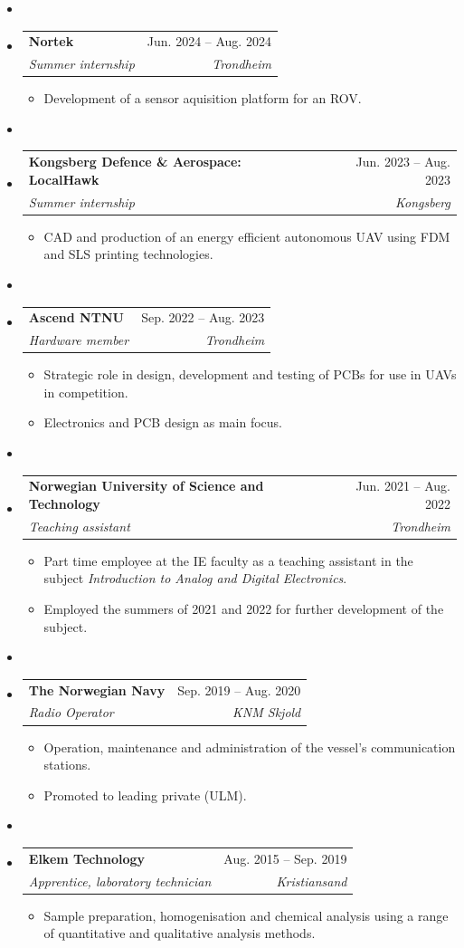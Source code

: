 \documentclass[letterpaper,12pt]{article}[leftmargin=*]
\makeatletter
\def \entryspacing {-0pt}
\newcommand{\resumeEntryStart}{\begin{itemize}[leftmargin=2.5mm]\item[]}
\newcommand{\resumeEntryEnd}{\end{itemize}\vspace{\entryspacing}}
\newcommand{\resumeItemListStart}{\begin{itemize}[leftmargin=4.5mm]}
\newcommand{\resumeItemListEnd}{\end{itemize}}
\newcommand{\resumeItem}[1]{
  \item\small{
    {#1 \vspace{-2pt}}
  }
}
\newcommand{\resumeEntryTSDL}[4]{
  \vspace{-1pt}\item[]
    \begin{tabularx}{0.97\textwidth}{X@{\hspace{60pt}}r}
      \textbf{\color{primary}#1} & {\firabook\color{accent}\small#2} \\
      \textit{\color{accent}\small#3} & \textit{\color{accent}\small#4} \\
    \end{tabularx}\vspace{-6pt}
}
\makeatother
\begin{document}
  \resumeEntryStart
    \resumeEntryTSDL
    {Nortek}{Jun. 2024 -- Aug. 2024}
    {Summer internship}{Trondheim}
  \resumeItemListStart
    \resumeItem{Development of a sensor aquisition platform for an ROV.}
  \resumeItemListEnd
  \resumeEntryEnd

  \resumeEntryStart
    \resumeEntryTSDL
      {Kongsberg Defence \& Aerospace: LocalHawk}{Jun. 2023 -- Aug. 2023}
      {Summer internship}{Kongsberg}
    \resumeItemListStart
      \resumeItem {CAD and production of an energy efficient autonomous UAV using FDM and SLS printing technologies.}
    \resumeItemListEnd
  \resumeEntryEnd

  \resumeEntryStart
    \resumeEntryTSDL
      {Ascend NTNU}{Sep. 2022 -- Aug. 2023}
      {Hardware member}{Trondheim}
    \resumeItemListStart
      \resumeItem {Strategic role in design, development and testing of PCBs for use in UAVs in competition.}
      \resumeItem {Electronics and PCB design as main focus.}
    \resumeItemListEnd
  \resumeEntryEnd

  \resumeEntryStart
    \resumeEntryTSDL
      {Norwegian University of Science and Technology}{Jun. 2021 -- Aug. 2022}
      {Teaching assistant}{Trondheim}
    \resumeItemListStart
      \resumeItem {Part time employee at the IE faculty as a teaching assistant in the subject \textit{Introduction to Analog and Digital Electronics}.}
      \resumeItem {Employed the summers of 2021 and 2022 for further development of the subject.}
    \resumeItemListEnd
  \resumeEntryEnd

  \resumeEntryStart
    \resumeEntryTSDL
      {The Norwegian Navy}{Sep. 2019 -- Aug. 2020}
      {Radio Operator}{KNM Skjold}
    \resumeItemListStart
        \resumeItem {Operation, maintenance and administration of the vessel's communication stations.}
        \resumeItem {Promoted to leading private (ULM).}
    \resumeItemListEnd
  \resumeEntryEnd
\newpage
  \resumeEntryStart
    \resumeEntryTSDL
      {Elkem Technology}{Aug. 2015 -- Sep. 2019}
      {Apprentice, laboratory technician}{Kristiansand}
    \resumeItemListStart
      \resumeItem {Sample preparation, homogenisation and chemical analysis using a range of quantitative and qualitative analysis methods.}
    \resumeItemListEnd
  \resumeEntryEnd


\end{document}
